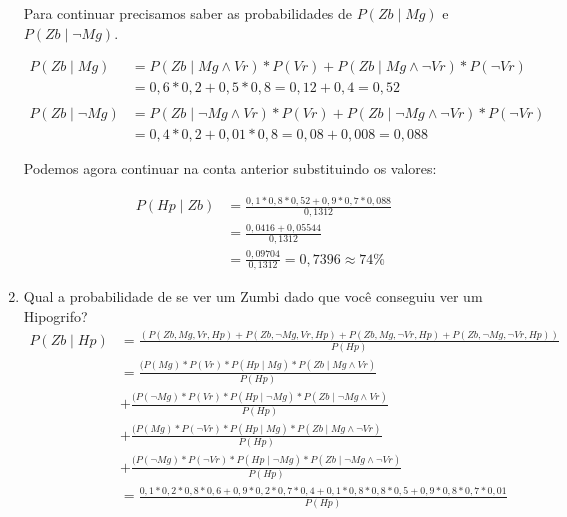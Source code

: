\documentclass{article}
\begin{document}
\begin{enumerate}
        Para continuar precisamos saber as probabilidades de $P(Zb \mid Mg)$ e $P(Zb \mid \neg Mg)$.
        
        \begin{align*}
            P(Zb \mid Mg) &= P(Zb \mid Mg \land Vr)*P(Vr)+P(Zb \mid Mg \land \neg Vr)*P(\neg Vr) \\
                          &= 0,6 * 0,2 + 0,5 * 0,8 = 0,12 + 0,4 = 0,52 \\ 
                          \\
            P(Zb \mid \neg Mg) &= P(Zb \mid \neg Mg \land Vr)*P(Vr)+P(Zb \mid \neg Mg \land \neg Vr)*P(\neg Vr) \\
                               &= 0,4 * 0,2 + 0,01 * 0,8 = 0,08 + 0,008 = 0,088
        \end{align*}
        
        Podemos agora continuar na conta anterior substituindo os valores:
        
        \begin{align*}
            P(Hp \mid Zb) &= \frac{0,1*0,8*0,52+0,9*0,7*0,088}{0,1312} \\
                          &= \frac{0,0416+0,05544}{0,1312} \\
                          &= \frac{0,09704}{0,1312} = 0,7396 \approx 74\%
        \end{align*}
    
    \item Qual a probabilidade de se ver um Zumbi dado que você conseguiu ver um Hipogrifo?
        \begin{align*}
            P(Zb \mid Hp) &= \frac{(P(Zb, Mg, Vr, Hp) + P(Zb, \neg Mg, Vr, Hp) + P(Zb, Mg, \neg Vr, Hp) + P(Zb, \neg Mg, \neg Vr, Hp))}{ P(Hp)} \\         
		                  &= \frac{(P(Mg) * P(Vr) * P(Hp \mid Mg) * P(Zb \mid Mg \land Vr)}{P(Hp)} \\ 
		                  &+ \frac{(P(\neg Mg) * P(Vr) * P(Hp \mid \neg Mg) * P(Zb \mid \neg Mg \land Vr)}{P(Hp)} \\
		                  &+ \frac{(P(Mg) * P(\neg Vr) * P(Hp \mid Mg) * P(Zb \mid Mg \land \neg Vr)}{P(Hp)} \\
		                  &+ \frac{(P(\neg Mg) * P(\neg Vr) * P(Hp \mid \neg Mg) * P(Zb \mid \neg Mg \land \neg Vr)}{P(Hp)} \\
		                  &= \frac{0,1 * 0,2 * 0,8 * 0,6 + 0,9 * 0,2 * 0,7 * 0,4 + 0,1 * 0,8 * 0,8 * 0,5 + 0,9 * 0,8 * 0,7 * 0,01}{P(Hp)}
        \end{align*}


\end{enumerate}
\end{document}
